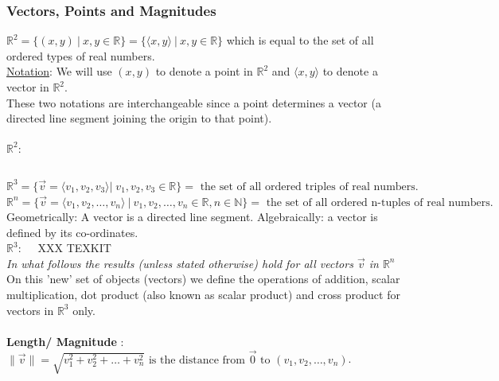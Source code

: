 \documentclass{report}
\begin{document}
\subsubsection{Vectors, Points and Magnitudes}
$\mathbb{R}^2 = \{ \left( x,y \right) ~|~x,y \in \mathbb{R}  \} = \{ \langle x , y\rangle~| ~x,y \in \mathbb{R}  \}  $ which is equal to the set of all ordered types of real numbers.\\
\underline{Notation}: We will use $\left( x,y \right) $ to denote a point in $\mathbb{R}^2$ and $\langle x ,y \rangle $ to denote a vector in $\mathbb{R}^2$.\\
These two notations are interchangeable since a point determines a vector (a directed line segment joining the origin to that point).\\
           \\
	   $ \mathbb{R} ^2:$ \\
\\
\[
\mathbb{R}^{3} = \{ \vec{v} = \langle  v_1,v_2,v_3 \rangle |_{}^{} ~v_1, v_2, v_3 \in \mathbb{R} \} = \text{ the set of all ordered triples of real numbers}
.\] 
\[
\mathbb{R}^{n}= \{ \vec{v} = \langle v_1,v_2,\ldots,v_n  \rangle ~|~ v_1,v_2,\ldots,v_n \in \mathbb{R}, n \in \mathbb{N} \} = \text{ the set of all ordered n-tuples of real numbers}
.\] Geometrically: A vector is a directed line segment. Algebraically: a vector is defined by its co-ordinates.\\
$ \mathbb{R} ^3:$ \ \
XXX TEXKIT
\\
\textit{In what follows the results (unless stated otherwise) hold for all vectors $\vec{v} $ in $\mathbb{R}^{n}$}\\
On this 'new' set of objects (vectors) we define the operations of addition, scalar multiplication, dot product (also known as scalar product) and cross product for vectors in $\mathbb{R}^{3}$ only.\\
\\
\textbf{ Length/ Magnitude} : $\|\vec{v} \|= \sqrt{v_1^2+v_2^2+\ldots+v_n^2}  \text{ is the distance from $\vec{0} $ to } \left( v_1,v_2,\ldots,v_n \right) $.\\
\\
\end{document}
